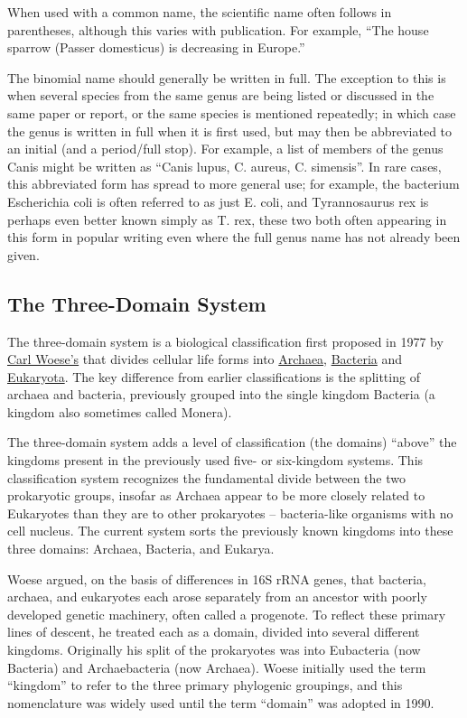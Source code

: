 When used with a common name, the scientific name often follows in parentheses, although this varies with publication. For example, ``The house sparrow (Passer domesticus) is decreasing in Europe.''

The binomial name should generally be written in full. The exception to this is when several species from the same genus are being listed or discussed in the same paper or report, or the same species is mentioned repeatedly; in which case the genus is written in full when it is first used, but may then be abbreviated to an initial (and a period/full stop). For example, a list of members of the genus Canis might be written as ``Canis lupus, C. aureus, C. simensis''. In rare cases, this abbreviated form has spread to more general use; for example, the bacterium Escherichia coli is often referred to as just E. coli, and Tyrannosaurus rex is perhaps even better known simply as T. rex, these two both often appearing in this form in popular writing even where the full genus name has not already been given.

\hypertarget{the-three-domain-system}{%
\subsection{The Three-Domain System}\label{the-three-domain-system}}

The three-domain system is a biological classification first proposed in 1977 by \href{https://en.wikipedia.org/wiki/Carl_Woese}{Carl Woese's} that divides cellular life forms into \href{https://en.wikipedia.org/wiki/Archaea}{Archaea}, \href{https://en.wikipedia.org/wiki/Bacteria}{Bacteria} and \href{https://en.wikipedia.org/wiki/Eukaryote}{Eukaryota}. The key difference from earlier classifications is the splitting of archaea and bacteria, previously grouped into the single kingdom Bacteria (a kingdom also sometimes called Monera).

The three-domain system adds a level of classification (the domains) ``above'' the kingdoms present in the previously used five- or six-kingdom systems. This classification system recognizes the fundamental divide between the two prokaryotic groups, insofar as Archaea appear to be more closely related to Eukaryotes than they are to other prokaryotes -- bacteria-like organisms with no cell nucleus. The current system sorts the previously known kingdoms into these three domains: Archaea, Bacteria, and Eukarya.

Woese argued, on the basis of differences in 16S rRNA genes, that bacteria, archaea, and eukaryotes each arose separately from an ancestor with poorly developed genetic machinery, often called a progenote. To reflect these primary lines of descent, he treated each as a domain, divided into several different kingdoms. Originally his split of the prokaryotes was into Eubacteria (now Bacteria) and Archaebacteria (now Archaea). Woese initially used the term ``kingdom'' to refer to the three primary phylogenic groupings, and this nomenclature was widely used until the term ``domain'' was adopted in 1990.

